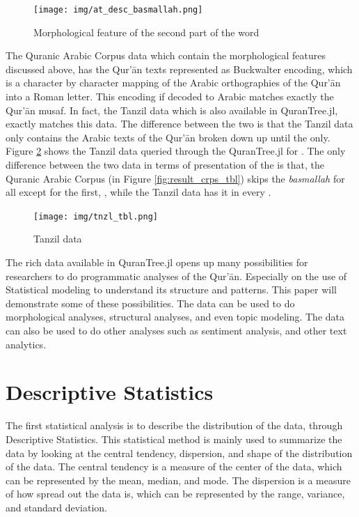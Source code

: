 \begin{figure}[!t]
    \centering
    \texttt{[image: img/at\_desc\_basmallah.png]}
    \caption{Morphological feature of the second part of the word }
    \label{fig:result_at_desc_basmallah}
\end{figure}

The Quranic Arabic Corpus data which contain the morphological features discussed above, has the Qur'\=an texts represented as Buckwalter encoding, which is a character by character mapping of the Arabic orthographies of the Qur'\=an into a Roman letter. This encoding if decoded to Arabic matches exactly the Qur'\=an musaf. In fact, the Tanzil data which is also available in QuranTree.jl, exactly matches this data. The difference between the two is that the Tanzil data only contains the Arabic texts of the Qur'\=an broken down up until the   only. Figure \ref{fig:result_tnzl_tbl} shows the Tanzil data queried through the QuranTree.jl for  . The only difference between the two data in terms of presentation of the   is that, the Quranic Arabic Corpus (in Figure \ref{fig:result_crps_tbl}) skips the \textit{basmallah} for all   except for the first,  , while the Tanzil data has it in every  .

\begin{figure}[!t]
    \centering
    \texttt{[image: img/tnzl\_tbl.png]}
    \caption{  Tanzil data}
    \label{fig:result_tnzl_tbl}
\end{figure}

The rich data available in QuranTree.jl opens up many possibilities for researchers to do programmatic analyses of the Qur'\=an. Especially on the use of Statistical modeling to understand its structure and patterns. This paper will demonstrate some of these possibilities. The data can be used to do morphological analyses, structural analyses, and even topic modeling. The data can also be used to do other analyses such as sentiment analysis, and other text analytics. 

\section{Descriptive Statistics}\label{sec:ch4_desc_stat}
The first statistical analysis is to describe the distribution of the data, through Descriptive Statistics. This statistical method is mainly used to summarize the data by looking at the central tendency, dispersion, and shape of the distribution of the data. The central tendency is a measure of the center of the data, which can be represented by the mean, median, and mode. The dispersion is a measure of how spread out the data is, which can be represented by the range, variance, and standard deviation.


